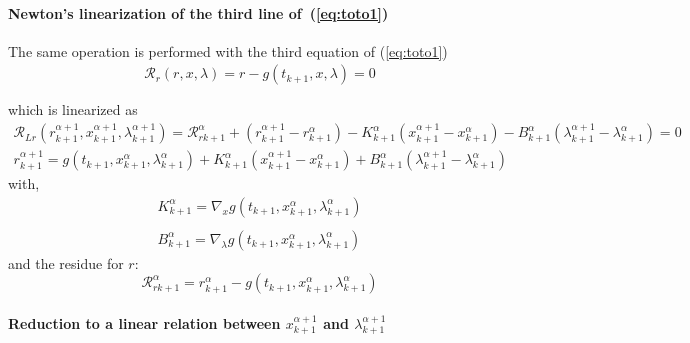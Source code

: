  \paragraph{Newton's linearization of the third  line of~(\ref{eq:toto1})}
The same operation is performed with the third equation of (\ref{eq:toto1})
\begin{equation}
  \begin{array}{l}
    \mathcal R_r(r,x,\lambda)=r-g(t_{k+1},x,\lambda) =0\\ \\  \end{array}
\end{equation}
which is linearized as
\begin{equation}
  \label{eq:NL9}
  \begin{array}{l}
      \mathcal R_{Lr}(r^{\alpha+1}_{k+1},x^{\alpha+1}_{k+1},\lambda^{\alpha+1}_{k+1}) = \mathcal
      R_{rk+1}^{\alpha} + (r^{\alpha+1}_{k+1} - r^{\alpha}_{k+1}) -
      K^{\alpha}_{k+1}(x^{\alpha+1}_{k+1} - x^{\alpha}_{k+1})- B^{\alpha}_{k+1}(\lambda^{\alpha+1}_{k+1} -
      \lambda^{\alpha}_{k+1})=0
    \end{array}
  \end{equation}
\begin{equation}
  \label{eq:rrL}
  \begin{array}{l}
    \boxed{r^{\alpha+1}_{k+1} = g(t_{k+1},x ^{\alpha}_{k+1},\lambda ^{\alpha}_{k+1}) +
      K^{\alpha}_{k+1}(x^{\alpha+1}_{k+1} - x^{\alpha}_{k+1})
      + B^{\alpha}_{k+1}(\lambda^{\alpha+1}_{k+1} - \lambda^{\alpha}_{k+1})
    }       
  \end{array}
\end{equation}
with,
\begin{equation}
     \begin{array}{l}
  K^{\alpha}_{k+1} = \nabla_xg(t_{k+1},x^{\alpha}_{k+1},\lambda ^{\alpha}_{k+1})  \\ \\
  B^{\alpha}_{k+1} = \nabla_{\lambda}g(t_{k+1},x^{\alpha}_{k+1},\lambda ^{\alpha}_{k+1})
 \end{array}
\end{equation}
and the  residue for $r$:
\begin{equation}
\boxed{\mathcal
      R_{rk+1}^{\alpha} = r^{\alpha}_{k+1} - g(t_{k+1},x^{\alpha}_{k+1},\lambda ^{\alpha}_{k+1})}
  \end{equation}


\paragraph{Reduction to a linear relation between  $x^{\alpha+1}_{k+1}$ and $\lambda^{\alpha+1}_{k+1}$}

